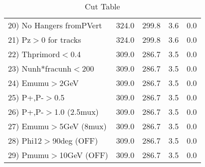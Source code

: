 \begin{table}[h!]
\begin{tabular}{||l||r|r|r|r||}
 20) No Hangers fromPVert &       324.0 &       299.8 &         3.6 &         0.0 \\
 21) Pz$>$0 for tracks    &       324.0 &       299.8 &         3.6 &         0.0 \\
 22) Thprimord$<$0.4      &       309.0 &       286.7 &         3.5 &         0.0 \\
 23) Nunh*fracunh$<$200   &       309.0 &       286.7 &         3.5 &         0.0 \\
 24) Emumu$>$2GeV         &       309.0 &       286.7 &         3.5 &         0.0 \\
 25) P+,P-$>$0.5          &       309.0 &       286.7 &         3.5 &         0.0 \\
 26) P+,P-$>$1.0 (2.5mux) &       309.0 &       286.7 &         3.5 &         0.0 \\
 27) Emumu$>$5GeV  (8mux) &       309.0 &       286.7 &         3.5 &         0.0 \\
 28) Phi12$>$90deg  (OFF) &       309.0 &       286.7 &         3.5 &         0.0 \\
 29) Pmumu$>$10GeV  (OFF) &       309.0 &       286.7 &         3.5 &         0.0 \\
 \hline
 \hline
 \end{tabular}
 \caption{Cut Table \cohpip }
 \label{tab-cut_copip}
 \end{table}

